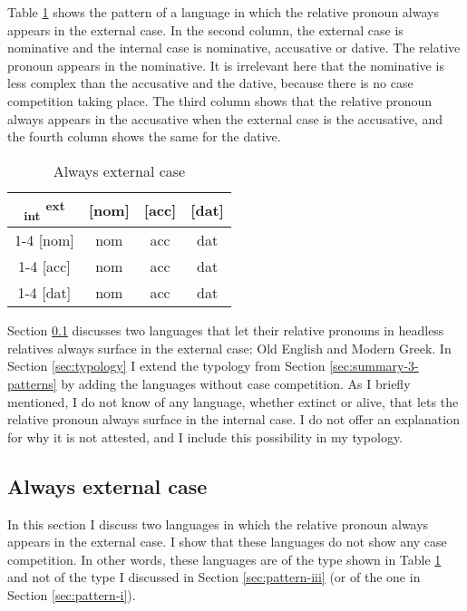 Table \ref{tbl:no-case-competition-ext} shows the pattern of a language in which the relative pronoun always appears in the external case. In the second column, the external case is nominative and the internal case is nominative, accusative or dative. The relative pronoun appears in the nominative. It is irrelevant here that the nominative is less complex than the accusative and the dative, because there is no case competition taking place. The third column shows that the relative pronoun always appears in the accusative when the external case is the accusative, and the fourth column shows the same for the dative.

\begin{table}[ht]
  \center
  \caption{Always external case}
  \begin{tabular}{c|c|c|c}
    \toprule
   \textsubscript{\ac{int}} \textsuperscript{\ac{ext}}
          & [\ac{nom}]
          & [\ac{acc}]
          & [\ac{dat}]
          \\ \cmidrule{1-4}
      [\ac{nom}]
          & \ac{nom}
          & \ac{acc}
          & \ac{dat}
          \\ \cmidrule{1-4}
      [\ac{acc}]
          & \ac{nom}
          & \ac{acc}
          & \ac{dat}
          \\ \cmidrule{1-4}
      [\ac{dat}]
          & \ac{nom}
          & \ac{acc}
          & \ac{dat}
          \\
    \bottomrule
  \end{tabular}
  \label{tbl:no-case-competition-ext}
\end{table}

Section \ref{sec:always-ext} discusses two languages that let their relative pronouns in headless relatives always surface in the external case: Old English and Modern Greek. In Section \ref{sec:typology} I extend the typology from Section \ref{sec:summary-3-patterns} by adding the languages without case competition. As I briefly mentioned, I do not know of any language, whether extinct or alive, that lets the relative pronoun always surface in the internal case. I do not offer an explanation for why it is not attested, and I include this possibility in my typology.

\subsection{Always external case}\label{sec:always-ext}

In this section I discuss two languages in which the relative pronoun always appears in the external case. I show that these languages do not show any case competition. In other words, these languages are of the type shown in Table \ref{tbl:no-case-competition-ext} and not of the type I discussed in Section \ref{sec:pattern-iii} (or of the one in Section \ref{sec:pattern-i}).

